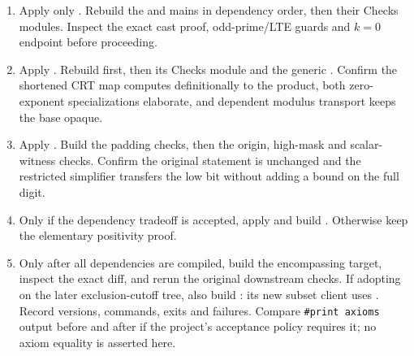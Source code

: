 \begin{enumerate}
\item Apply only . Rebuild the  and  mains in dependency order, then their Checks modules. Inspect the exact cast proof, odd-prime/LTE guards and $k=0$ endpoint before proceeding.
\item Apply . Rebuild  first, then its Checks module and the generic . Confirm the shortened CRT map computes definitionally to the product, both zero-exponent specializations elaborate, and dependent modulus transport keeps the base opaque.
\item Apply . Build the padding checks, then the origin, high-mask and scalar-witness checks. Confirm the original statement is unchanged and the restricted simplifier transfers the low bit without adding a bound on the full digit.
\item Only if the dependency tradeoff is accepted, apply  and build . Otherwise keep the elementary positivity proof.
\item Only after all dependencies are compiled, build the encompassing  target, inspect the exact diff, and rerun the original downstream checks. If adopting on the later exclusion-cutoff tree, also build : its new subset client uses . Record versions, commands, exits and failures. Compare \texttt{\#print axioms} output before and after if the project's acceptance policy requires it; no axiom equality is asserted here.
\end{enumerate}

